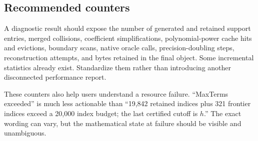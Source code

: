 \subsection{Recommended counters}
A diagnostic result should expose the number of generated and retained support entries, merged collisions, coefficient simplifications, polynomial-power cache hits and evictions, boundary scans, native oracle calls, precision-doubling steps, reconstruction attempts, and bytes retained in the final object. Some incremental statistics already exist. Standardize them rather than introducing another disconnected performance report.\cite{incremental}

These counters also help users understand a resource failure. ``MaxTerms exceeded'' is much less actionable than ``19,842 retained indices plus 321 frontier indices exceed a 20,000 index budget; the last certified cutoff is $h$.'' The exact wording can vary, but the mathematical state at failure should be visible and unambiguous.
